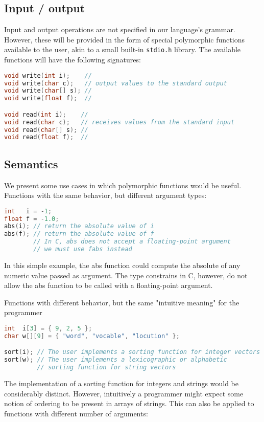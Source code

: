 \documentclass[12pt]{article}
\begin{document}
\subsection{Input / output}
Input and output operations are not specified in our language's grammar. However, these will be provided
in the form of special polymorphic functions available to the user, akin to a small built-in
\texttt{stdio.h} library. The available functions will have the following signatures:

\begin{lstlisting}[language=C]
void write(int i);    //
void write(char c);   // output values to the standard output
void write(char[] s); //
void write(float f);  //

void read(int i);    //
void read(char c);   // receives values from the standard input
void read(char[] s); //
void read(float f);  //
\end{lstlisting}

\subsection{Semantics}
We present some use cases in which polymorphic functions would be useful. Functions with the same behavior, but different argument types:

\begin{lstlisting}[language=C]
int   i = -1;
float f = -1.0;
abs(i); // return the absolute value of i
abs(f); // return the absolute value of f
        // In C, abs does not accept a floating-point argument
        // we must use fabs instead
\end{lstlisting}

In this simple example, the abs function could compute the absolute of any numeric value passed as argument. The type constrains in C, however, do not allow the abs function to be called with a floating-point argument.

Functions with different behavior, but the same "intuitive meaning" for the programmer

\begin{lstlisting}[language=C]
int  i[3] = { 9, 2, 5 };
char w[][9] = { "word", "vocable", "locution" };

sort(i); // The user implements a sorting function for integer vectors
sort(w); // The user implements a lexicographic or alphabetic
         // sorting function for string vectors
\end{lstlisting}

The implementation of a sorting function for integers and strings would be considerably distinct. However, intuitively a programmer might expect some notion of ordering to be present in arrays of strings. This can also be applied to functions with different number of arguments:
\end{document}

